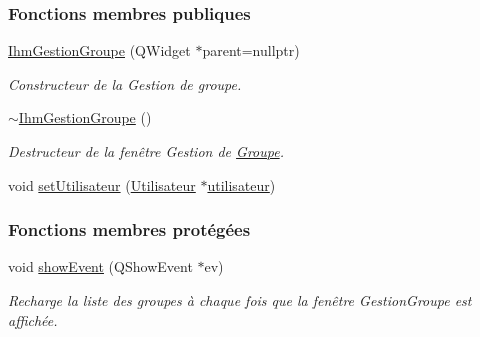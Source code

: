 \subsubsection*{Fonctions membres publiques}
\begin{DoxyCompactItemize}
\item 
\hyperlink{class_ihm_gestion_groupe_a27632f9cf5b66f4403c3534ee0e0ad18}{Ihm\+Gestion\+Groupe} (Q\+Widget $\ast$parent=nullptr)
\begin{DoxyCompactList}\small\item\em Constructeur de la Gestion de groupe. \end{DoxyCompactList}\item 
\hyperlink{class_ihm_gestion_groupe_aba32d8b8ea5b7d31232d41ae051ebcb7}{$\sim$\+Ihm\+Gestion\+Groupe} ()
\begin{DoxyCompactList}\small\item\em Destructeur de la fenêtre Gestion de \hyperlink{class_groupe}{Groupe}. \end{DoxyCompactList}\item 
void \hyperlink{class_ihm_gestion_groupe_a88bbe8b5652781d4a80a50ed6bf9d329}{set\+Utilisateur} (\hyperlink{class_utilisateur}{Utilisateur} $\ast$\hyperlink{class_ihm_gestion_groupe_a87b9d242561e8bf7765aa14a5e124db1}{utilisateur})
\end{DoxyCompactItemize}
\subsubsection*{Fonctions membres protégées}
\begin{DoxyCompactItemize}
\item 
void \hyperlink{class_ihm_gestion_groupe_a813459240b9382aaa1f88593bcdea41b}{show\+Event} (Q\+Show\+Event $\ast$ev)
\begin{DoxyCompactList}\small\item\em Recharge la liste des groupes à chaque fois que la fenêtre Gestion\+Groupe est affichée. \end{DoxyCompactList}\end{DoxyCompactItemize}
